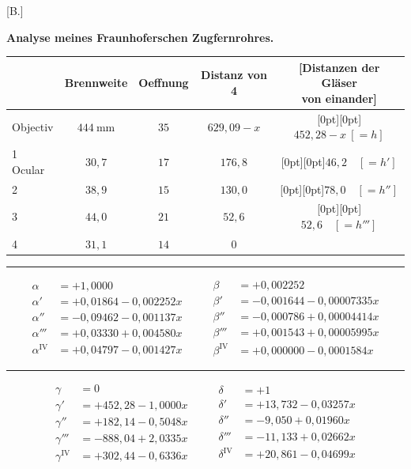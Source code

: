 \clearpage\begingroup
{}
\begin{center}[B.]\end{center}
\noindent{\small [S. 308]}
\begin{center}\textbf{Analyse meines Fraunhoferschen Zugfernrohres.}\end{center}
\begin{center}\small
\setlength{\tabcolsep}{3.5pt}\renewcommand{\arraystretch}{1.5}
\begin{tabular}{l|c|c|c|c}
\hline\hline
&Brennweite&Oeffnung&Distanz von 4&\shortstack{[Distanzen der Gläser\\von einander]}\\
\hline\hline
Objectiv&$444\ \mathrm{mm}$&$35$&$629{,}09-x$&\raisebox{-.55\normalbaselineskip}[0pt][0pt]{$452{,}28-x\ [=h]$}\\
1 Ocular&$30{,}7$&$17$&$176{,}8$&\raisebox{-.55\normalbaselineskip}[0pt][0pt]{$46{,}2\quad[=h']$}\\
2&$38{,}9$&$15$&$130{,}0$&\raisebox{-.55\normalbaselineskip}[0pt][0pt]{$78{,}0\quad[=h'']$}\\
3&$44{,}0$&$21$&$52{,}6$&\raisebox{-.55\normalbaselineskip}[0pt][0pt]{$52{,}6\quad[=h''']$}\\
4&$31{,}1$&$14$&$0$&
\end{tabular}
\end{center}
\noindent\rule{\linewidth}{.4pt}
\[
\begin{aligned}
\alpha&=+1{,}0000\\
\alpha'&=+0{,}01864-0{,}002252x\\
\alpha''&=-0{,}09462-0{,}001137x\\
\alpha'''&=+0{,}03330+0{,}004580x\\
\alpha^{\mathrm{IV}}&=+0{,}04797-0{,}001427x
\end{aligned}\qquad
\begin{aligned}
\beta&=+0{,}002252\\
\beta'&=-0{,}001644-0{,}00007335x\\
\beta''&=-0{,}000786+0{,}00004414x\\
\beta'''&=+0{,}001543+0{,}00005995x\\
\beta^{\mathrm{IV}}&=+0{,}000000-0{,}0001584x
\end{aligned}
\]
\noindent\rule{\linewidth}{.4pt}
\[
\begin{aligned}
\gamma&=0\\
\gamma'&=+452{,}28-1{,}0000x\\
\gamma''&=+182{,}14-0{,}5048x\\
\gamma'''&=-888{,}04+2{,}0335x\\
\gamma^{\mathrm{IV}}&=+302{,}44-0{,}6336x
\end{aligned}\qquad
\begin{aligned}
\delta&=+1\\
\delta'&=+13{,}732-0{,}03257x\\
\delta''&=-9{,}050+0{,}01960x\\
\delta'''&=-11{,}133+0{,}02662x\\
\delta^{\mathrm{IV}}&=+20{,}861-0{,}04699x
\end{aligned}
\]

